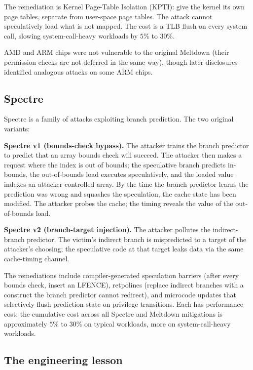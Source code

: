 The remediation is Kernel Page-Table Isolation (KPTI): give the kernel its own page tables, separate from user-space page tables. The attack cannot speculatively load what is not mapped. The cost is a TLB flush on every system call, slowing system-call-heavy workloads by $5\%$ to $30\%$.

AMD and ARM chips were not vulnerable to the original Meltdown (their permission checks are not deferred in the same way), though later disclosures identified analogous attacks on some ARM chips.

\subsection{Spectre}

Spectre \cite{paper:kocher-spectre-2019} is a family of attacks exploiting branch prediction. The two original variants:

\textbf{Spectre v1 (bounds-check bypass).} The attacker trains the branch predictor to predict that an array bounds check will succeed. The attacker then makes a request where the index is out of bounds; the speculative branch predicts in-bounds, the out-of-bounds load executes speculatively, and the loaded value indexes an attacker-controlled array. By the time the branch predictor learns the prediction was wrong and squashes the speculation, the cache state has been modified. The attacker probes the cache; the timing reveals the value of the out-of-bounds load.

\textbf{Spectre v2 (branch-target injection).} The attacker pollutes the indirect-branch predictor. The victim's indirect branch is mispredicted to a target of the attacker's choosing; the speculative code at that target leaks data via the same cache-timing channel.

The remediations include compiler-generated speculation barriers (after every bounds check, insert an LFENCE), retpolines (replace indirect branches with a construct the branch predictor cannot redirect), and microcode updates that selectively flush prediction state on privilege transitions. Each has performance cost; the cumulative cost across all Spectre and Meltdown mitigations is approximately $5\%$ to $30\%$ on typical workloads, more on system-call-heavy workloads.

\subsection{The engineering lesson}

